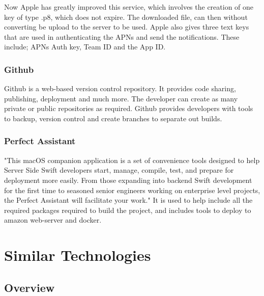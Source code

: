 Now Apple has greatly improved this service, which involves the creation of one key of type .p8, which does not expire. The downloaded file, can then without converting be upload to the server to be used. Apple also gives three text keys that are used in authenticating the APNs and send the notifications. These include; APNs Auth key, Team ID and the App ID.

\subsubsection{Github}

Github \cite{github} is a web-based version control repository. It provides code sharing, publishing, deployment and much more. The developer can create as many private or public repositories as required. Github provides developers with tools to backup, version control and create branches to separate out builds.

\subsubsection{Perfect Assistant}
"This macOS companion application is a set of convenience tools designed to help Server Side Swift developers start, manage, compile, test, and prepare for deployment more easily. From those expanding into backend Swift development for the first time to seasoned senior engineers working on enterprise level projects, the Perfect Assistant will facilitate your work." \cite{perfectAssist} It is used to help include all the required packages required to build the project, and includes tools to deploy to amazon web-server and docker.



\section{Similar Technologies}

\subsection{Overview}

